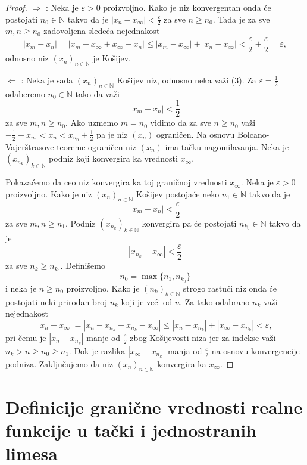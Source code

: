 \documentclass[a4paper,12pt]{article}
\theoremstyle{plain}
\theoremstyle{definition}
\theoremstyle{remark}
\begin{document}
\begin{proof}
$\Longrightarrow$ : Neka je $\varepsilon > 0$ proizvoljno. Kako je niz konvergentan onda će postojati $n_0 \in \mathbb{N}$ takvo da je $|x_n - x_{\infty}| < \frac{\varepsilon}{2}$ za sve $n \geq n_0$. Tada je za sve $m, n \geq n_0$ zadovoljena sledeća nejednakost
$$ |x_m - x_n| = |x_m - x_{\infty} + x_{\infty} - x_n| \leq |x_m - x_{\infty}| + |x_n - x_{\infty}| < \frac{\varepsilon}{2} + \frac{\varepsilon}{2} = \varepsilon, $$
odnosno niz $(x_n)_{n \in \mathbb{N}}$ je Košijev.

$\Longleftarrow$ : Neka je sada $(x_n)_{n \in \mathbb{N}}$ Košijev niz, odnosno neka važi (3). Za $\varepsilon = \frac{1}{2}$ odaberemo $n_0 \in \mathbb{N}$ tako da važi
$$ |x_m - x_n| < \frac{1}{2} $$
za sve $m, n \geq n_0$. Ako uzmemo $m = n_0$ vidimo da za sve $n \geq n_0$ važi $-\frac{1}{2} + x_{n_0} < x_n < x_{n_0} + \frac{1}{2}$ pa je niz $(x_n)$ ograničen. Na osnovu Bolcano-Vajerštrasove teoreme ograničen niz $(x_n)$ ima tačku nagomilavanja. Neka je $(x_{n_k})_{k \in \mathbb{N}}$ podniz koji konvergira ka vrednosti $x_{\infty}$.

Pokazaćemo da ceo niz konvergira ka toj graničnoj vrednosti $x_{\infty}$. Neka je $\varepsilon > 0$ proizvoljno. Kako je niz $(x_n)_{n \in \mathbb{N}}$ Košijev postojaće neko $n_1 \in \mathbb{N}$ takvo da je
$$ |x_m - x_n| < \frac{\varepsilon}{2} $$
za sve $m, n \geq n_1$. Podniz $(x_{n_k})_{k \in \mathbb{N}}$ konvergira pa će postojati $n_{k_0} \in \mathbb{N}$ takvo da je
$$ |x_{n_k} - x_{\infty}| < \frac{\varepsilon}{2} $$
za sve $n_k \geq n_{k_0}$. Definišemo
$$ n_0 = \max\{n_1, n_{k_0}\} $$
i neka je $n \geq n_0$ proizvoljno. Kako je $(n_k)_{k \in \mathbb{N}}$ strogo rastući niz onda će postojati neki prirodan broj $n_k$ koji je veći od $n$. Za tako odabrano $n_k$ važi nejednakost
$$ |x_n - x_{\infty}| = |x_n - x_{n_k} + x_{n_k} - x_{\infty}| \leq |x_n - x_{n_k}| + |x_{\infty} - x_{n_k}| < \varepsilon, $$
pri čemu je $|x_n - x_{n_k}|$ manje od $\frac{\varepsilon}{2}$ zbog Košijevosti niza jer za indekse važi $n_k > n \geq n_0 \geq n_1$. Dok je razlika $|x_{\infty} - x_{n_k}|$ manja od $\frac{\varepsilon}{2}$ na osnovu konvergencije podniza. Zaključujemo da niz $(x_n)_{n \in \mathbb{N}}$ konvergira ka $x_{\infty}$.
\end{proof}

\section{Definicije granične vrednosti realne funkcije u tački i jednostranih limesa}
\end{document}
